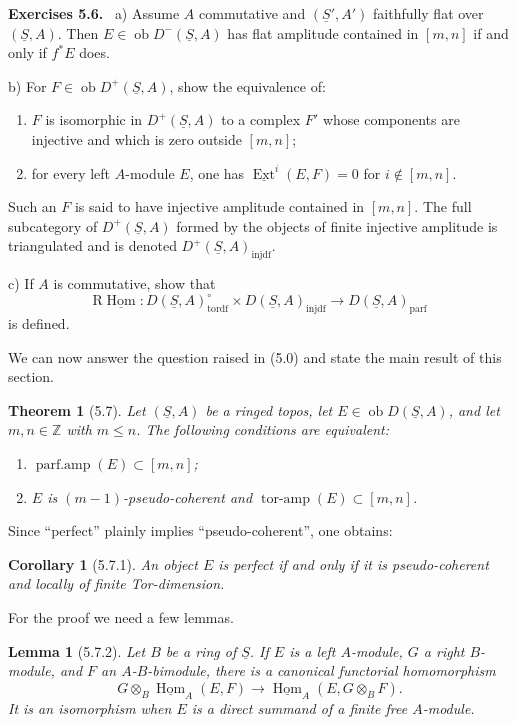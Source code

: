 \documentclass[13pt]{extarticle}
\newcommand{\ZZ}{\mathbb Z}
\newcommand{\uS}{\underline S}
\newcommand{\ob}{\operatorname{ob}}
\newcommand{\Hom}{\operatorname{Hom}}
\newcommand{\Ext}{\operatorname{Ext}}
\newcommand{\RHom}{\mathrm R\underline{\operatorname{Hom}}}
\newenvironment{statement}[1]{\par\medskip\noindent\textbf{#1.}\ }{\par\medskip}
\newtheorem*{lemma*}{Lemma}
\newtheorem*{corollary*}{Corollary}
\newtheorem*{theorem*}{Theorem}
\begin{document}
\begin{statement}{Exercises 5.6}
\textup{a)} Assume $A$ commutative and $(\uS',A')$ faithfully flat over $(\uS,A)$. Then $E\in\ob D^-(\uS,A)$ has flat amplitude contained in $[m,n]$ if and only if $f^*E$ does.

\textup{b)} For $F\in\ob D^+(\uS,A)$, show the equivalence of:
\begin{enumerate}[label=(\roman*)]
\item $F$ is isomorphic in $D^+(\uS,A)$ to a complex $F'$ whose components are injective and which is zero outside $[m,n]$;
\item for every left $A$-module $E$, one has $\underline{\Ext}^i(E,F)=0$ for $i\notin[m,n]$.
\end{enumerate}
Such an $F$ is said to have injective amplitude contained in $[m,n]$. The full subcategory of $D^+(\uS,A)$ formed by the objects of finite injective amplitude is triangulated and is denoted $D^+(\uS,A)_{\mathrm{injdf}}$.

\textup{c)} If $A$ is commutative, show that
\[
\RHom:D(\uS,A)_{\mathrm{tordf}}^\circ\times
D(\uS,A)_{\mathrm{injdf}}
\longrightarrow D(\uS,A)_{\mathrm{parf}}
\]
is defined.
\end{statement}

We can now answer the question raised in (5.0) and state the main result of this section.

\begin{theorem*}[5.7]
Let $(\uS,A)$ be a ringed topos, let $E\in\ob D(\uS,A)$, and let $m,n\in\ZZ$ with $m\leq n$. The following conditions are equivalent:
\begin{enumerate}[label=(\roman*)]
\item $\operatorname{parf.amp}(E)\subset[m,n]$;
\item $E$ is $(m-1)$-pseudo-coherent and $\operatorname{tor\text{-}amp}(E)\subset[m,n]$.
\end{enumerate}
\end{theorem*}

Since ``perfect'' plainly implies ``pseudo-coherent'', one obtains:

\begin{corollary*}[5.7.1]
An object $E$ is perfect if and only if it is pseudo-coherent and locally of finite Tor-dimension.
\end{corollary*}

For the proof we need a few lemmas.

\begin{lemma*}[5.7.2]
Let $B$ be a ring of $\uS$. If $E$ is a left $A$-module, $G$ a right $B$-module, and $F$ an $A$-$B$-bimodule, there is a canonical functorial homomorphism
\[
G\otimes_B\underline{\Hom}_A(E,F)
\longrightarrow
\underline{\Hom}_A(E,G\otimes_BF).
\]
It is an isomorphism when $E$ is a direct summand of a finite free $A$-module.
\end{lemma*}
\end{document}
